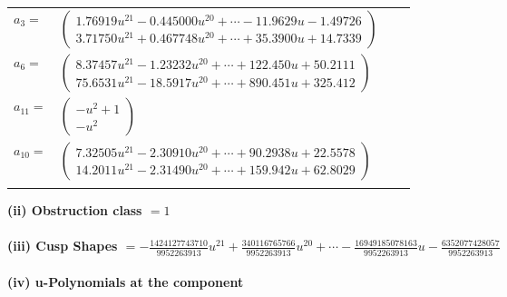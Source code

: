 \documentclass[1p]{elsarticle_modified}
\theoremstyle{definition}
\begin{document}
\begin{tabular}{m{7pt} m{180pt} m{7pt} m{180pt} }
\flushright $a_{3}=$&$\begin{pmatrix}1.76919 u^{21}-0.445000 u^{20}+\cdots-11.9629 u-1.49726\\3.71750 u^{21}+0.467748 u^{20}+\cdots+35.3900 u+14.7339\end{pmatrix}$ \\
\flushright $a_{6}=$&$\begin{pmatrix}8.37457 u^{21}-1.23232 u^{20}+\cdots+122.450 u+50.2111\\75.6531 u^{21}-18.5917 u^{20}+\cdots+890.451 u+325.412\end{pmatrix}$ \\
\flushright $a_{11}=$&$\begin{pmatrix}- u^2+1\\- u^2\end{pmatrix}$ \\
\flushright $a_{10}=$&$\begin{pmatrix}7.32505 u^{21}-2.30910 u^{20}+\cdots+90.2938 u+22.5578\\14.2011 u^{21}-2.31490 u^{20}+\cdots+159.942 u+62.8029\end{pmatrix}$\\&\end{tabular}
\flushleft \textbf{(ii) Obstruction class $= 1$}\\~\\
\flushleft \textbf{(iii) Cusp Shapes $= -\frac{1424127743710}{9952263913} u^{21}+\frac{340116765766}{9952263913} u^{20}+\cdots-\frac{16949185078163}{9952263913} u-\frac{6352077428057}{9952263913}$}\\~\\
\newpage\renewcommand{\arraystretch}{1}
\flushleft \textbf{(iv) u-Polynomials at the component}\newline \\
\end{document}
